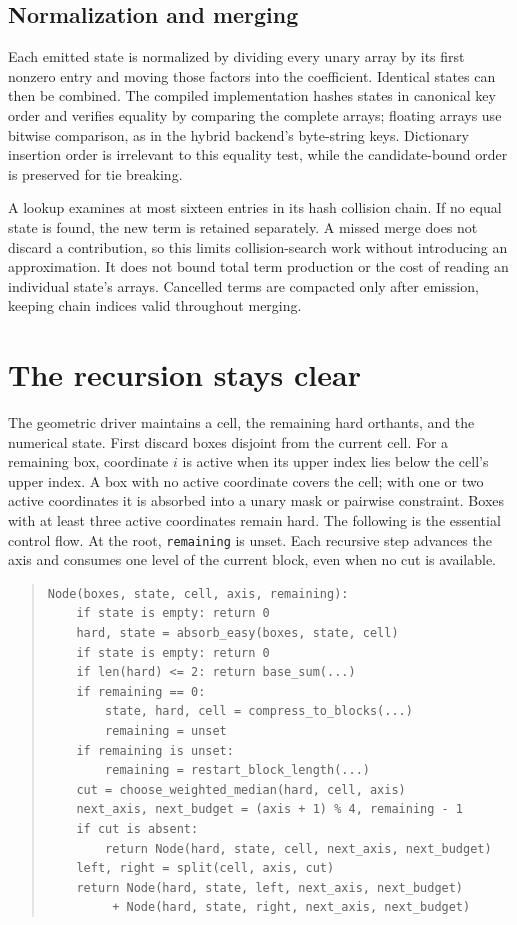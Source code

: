 \documentclass[12pt,a4paper]{article}
\begin{document}
\subsection*{Normalization and merging}
Each emitted state is normalized by dividing every unary array by its first
nonzero entry and moving those factors into the coefficient. Identical states
can then be combined. The compiled implementation hashes states in canonical
key order and verifies equality by comparing the complete arrays; floating
arrays use bitwise comparison, as in the hybrid backend's byte-string keys.
Dictionary insertion order is irrelevant to this equality test, while the
candidate-bound order is preserved for tie breaking.

A lookup examines at most sixteen entries in its hash collision chain.
If no equal state is found, the new term is retained separately. A missed
merge does not discard a contribution, so this limits collision-search work
without introducing an approximation. It does not bound total term production
or the cost of reading an individual state's arrays. Cancelled terms are
compacted only after emission, keeping chain indices valid throughout merging.

\section{The recursion stays clear}
The geometric driver maintains a cell, the remaining hard orthants, and the
numerical state. First discard boxes disjoint from the current cell. For a
remaining box, coordinate $i$ is active when its upper index lies below the
cell's upper index. A box with no active coordinate covers the cell; with
one or two active coordinates it is absorbed into a unary mask or pairwise
constraint. Boxes with at least three active coordinates remain hard.
The following is the essential control flow. At the root, \texttt{remaining}
is unset. Each recursive step advances the axis and consumes one level of
the current block, even when no cut is available.

\begin{quote}\small
\begin{verbatim}
Node(boxes, state, cell, axis, remaining):
    if state is empty: return 0
    hard, state = absorb_easy(boxes, state, cell)
    if state is empty: return 0
    if len(hard) <= 2: return base_sum(...)
    if remaining == 0:
        state, hard, cell = compress_to_blocks(...)
        remaining = unset
    if remaining is unset:
        remaining = restart_block_length(...)
    cut = choose_weighted_median(hard, cell, axis)
    next_axis, next_budget = (axis + 1) % 4, remaining - 1
    if cut is absent:
        return Node(hard, state, cell, next_axis, next_budget)
    left, right = split(cell, axis, cut)
    return Node(hard, state, left, next_axis, next_budget)
         + Node(hard, state, right, next_axis, next_budget)
\end{verbatim}
\end{quote}
\end{document}
